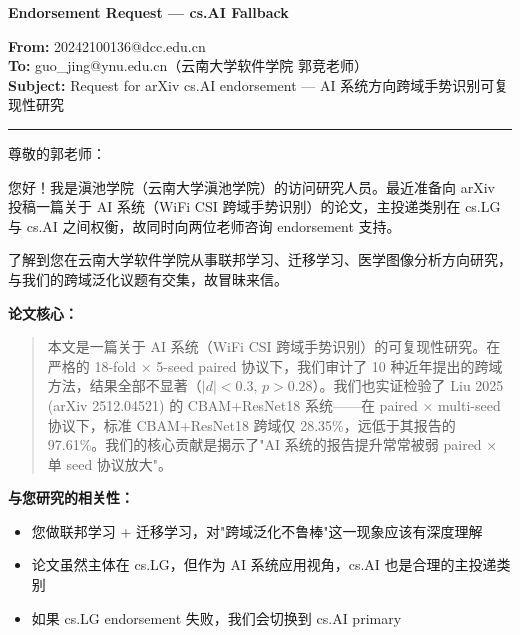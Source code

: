 \documentclass[11pt]{article}
\begin{document}
\begin{center}
\Large\bfseries Endorsement Request --- cs.AI Fallback
\end{center}

\vspace{0.3cm}

\noindent\textbf{From:} 20242100136@dcc.edu.cn \\
\textbf{To:} guo_jing@ynu.edu.cn（云南大学软件学院 郭竞老师） \\
\textbf{Subject:} Request for arXiv cs.AI endorsement --- AI 系统方向跨域手势识别可复现性研究

\vspace{0.3cm}
\hrule
\vspace{0.3cm}

\noindent 尊敬的郭老师：

您好！我是滇池学院（云南大学滇池学院）的访问研究人员。最近准备向 arXiv 投稿一篇关于 AI 系统（WiFi CSI 跨域手势识别）的论文，主投递类别在 cs.LG 与 cs.AI 之间权衡，故同时向两位老师咨询 endorsement 支持。

\vspace{0.2cm}

\noindent 了解到您在云南大学软件学院从事联邦学习、迁移学习、医学图像分析方向研究，与我们的跨域泛化议题有交集，故冒昧来信。

\vspace{0.2cm}

\noindent\textbf{论文核心：}

\begin{quote}
\small
本文是一篇关于 AI 系统（WiFi CSI 跨域手势识别）的可复现性研究。在严格的 18-fold × 5-seed paired 协议下，我们审计了 10 种近年提出的跨域方法，结果全部不显著（$|d|<0.3$, $p>0.28$）。我们也实证检验了 Liu 2025 (arXiv 2512.04521) 的 CBAM+ResNet18 系统——在 paired × multi-seed 协议下，标准 CBAM+ResNet18 跨域仅 28.35\%，远低于其报告的 97.61\%。我们的核心贡献是揭示了"AI 系统的报告提升常常被弱 paired × 单 seed 协议放大"。
\end{quote}

\vspace{0.2cm}

\noindent\textbf{与您研究的相关性：}
\begin{itemize}
\item 您做联邦学习 + 迁移学习，对"跨域泛化不鲁棒"这一现象应该有深度理解
\item 论文虽然主体在 cs.LG，但作为 AI 系统应用视角，cs.AI 也是合理的主投递类别
\item 如果 cs.LG endorsement 失败，我们会切换到 cs.AI primary
\end{itemize}
\end{document}

